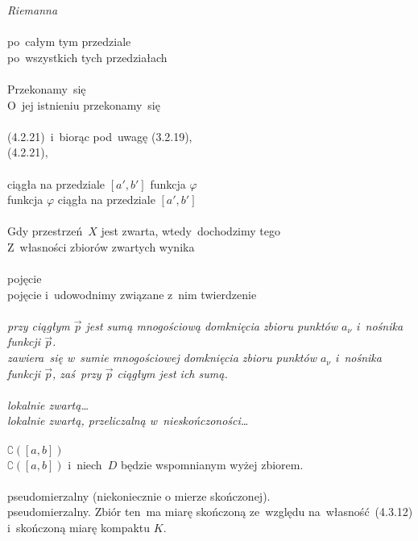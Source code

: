 \documentclass[a4paper,11pt]{article}
\begin{document}
\Powin  \emph{Riemanna} \\
 \\
\Jest po~całym tym przedziale \\
\Powin  po~wszystkich tych przedziałach \\
 \\
\Jest Przekonamy~się \\
\Powin  O~jej istnieniu przekonamy~się \\
 \\
\Jest (4.2.21)~i~biorąc pod~uwagę (3.2.19), \\
\Powin (4.2.21), \\
 \\
\Jest ciągła na przedziale $[ a', b' ]$ funkcja $\varphi$ \\
\Powin  funkcja $\varphi$ ciągła na przedziale $[ a', b' ]$ \\
 \\
\Jest Gdy przestrzeń~$X$ jest zwarta, wtedy~dochodzimy tego \\
\Powin  Z~własności zbiorów zwartych wynika \\
 \\
\Jest pojęcie \\
\Powin  pojęcie i~udowodnimy związane z~nim twierdzenie \\
 \\
\Jest \emph{przy ciągłym $\vec{ p }$ jest sumą mnogościową domknięcia
  zbioru punktów $a_{ \nu }$ i~nośnika
  funkcji $\vec{ p }$.} \\
\Powin \emph{zawiera~się w~sumie mnogościowej domknięcia zbioru
  punktów $a_{ \nu }$ i~nośnika funkcji $\vec{ p }$, zaś~przy
  $\vec{ p }$
  ciągłym jest ich sumą.} \\
 \\
\Jest \emph{lokalnie zwartą\ldots} \\
\Powin  \emph{lokalnie zwartą, przeliczalną w~nieskończoności\ldots} \\
 \\
\Jest $\complement ( [ a, b ] )$ \\
\Powin $\complement ( [ a, b ] )$ i~niech~$D$ będzie wspomnianym wyżej
zbiorem. \\
 \\
\Jest pseudomierzalny (niekoniecznie o mierze skończonej). \\
\Powin pseudomierzalny. Zbiór ten~ma miarę skończoną ze~względu
na~własność~(4.3.12) i~skończoną miarę kompaktu $K$. \\
\end{document}
